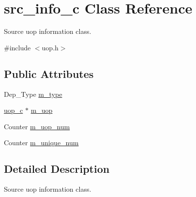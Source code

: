 \hypertarget{classsrc__info__c}{
\section{src\_\-info\_\-c Class Reference}
\label{classsrc__info__c}
}


Source uop information class.  




{\ttfamily \#include $<$uop.h$>$}

\subsection*{Public Attributes}
\begin{DoxyCompactItemize}
\item 
Dep\_\-Type \hyperlink{classsrc__info__c_af096f1eef285470cb6c8be0f1825f933}{m\_\-type}
\item 
\hyperlink{classuop__c}{uop\_\-c} $\ast$ \hyperlink{classsrc__info__c_a4662ae6dcff03aa4ece558599eea0ff6}{m\_\-uop}
\item 
Counter \hyperlink{classsrc__info__c_a81bb86aa213c5ef9ccb17f51c3d37dca}{m\_\-uop\_\-num}
\item 
Counter \hyperlink{classsrc__info__c_ac423ede8bc77893cf776cdebba9f081f}{m\_\-unique\_\-num}
\end{DoxyCompactItemize}


\subsection{Detailed Description}
Source uop information class. 

